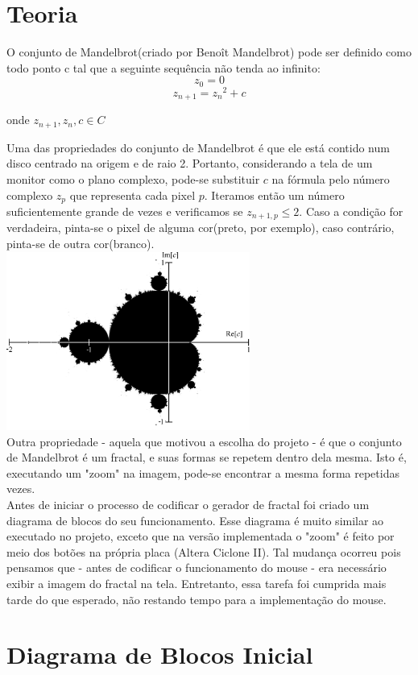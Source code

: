 \documentclass[a4paper, 12pt]{article}
\begin{document}
\section{Teoria}

O conjunto de Mandelbrot(criado por Benoît Mandelbrot) pode ser definido como todo ponto c tal que a seguinte sequência não tenda ao infinito:
$$ z_0 = 0$$
$$z_{n+1} = {z_n}^2 + c$$

onde $z_{n+1}, z_n, c ∈ C$

Uma das propriedades do conjunto de Mandelbrot é que ele está contido num disco centrado na origem e de raio 2. Portanto, considerando a tela de um monitor como o plano complexo, pode-se substituir $c$ na fórmula pelo número complexo $z_p$ que representa cada pixel $p$. Iteramos então um número suficientemente grande de vezes e verificamos se $z_{n+1,p} \leq 2$. Caso a condição for verdadeira, pinta-se o pixel de alguma cor(preto, por exemplo), caso contrário, pinta-se de outra cor(branco). \\[2cm]
\includegraphics[width=0.6\textwidth]{./mandelbrot.png}~\\[2cm]
Outra propriedade - aquela que motivou a escolha do projeto - é que o conjunto de Mandelbrot é um fractal, e suas formas se repetem dentro dela mesma. Isto é, executando um "zoom" na imagem, pode-se encontrar a mesma forma repetidas vezes.\\[2cm]

Antes de iniciar o processo de codificar o gerador de fractal foi criado um diagrama de blocos do seu funcionamento. Esse diagrama é muito similar ao executado no projeto, exceto que na versão implementada o "zoom" é feito por meio dos botões na própria placa (Altera Ciclone II). Tal mudança ocorreu pois pensamos que -  antes de codificar o funcionamento do mouse - era necessário exibir a imagem do fractal na tela. Entretanto, essa tarefa foi cumprida mais tarde do que esperado, não restando tempo para a implementação do mouse.
\section{Diagrama de Blocos Inicial}
\end{document}
